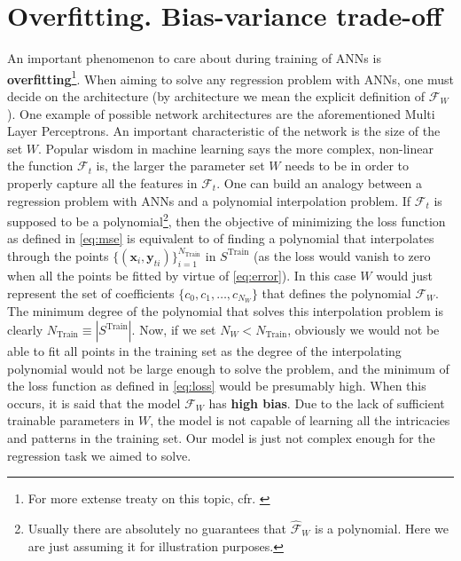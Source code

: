 \section{Overfitting. Bias-variance trade-off}\label{sec:overfitting}
\indent An important phenomenon to care about during training of ANNs is \textbf{overfitting}\footnote{For more extense treaty on this topic, cfr. \cite{Marsland2015Machine}}. When aiming to solve any regression problem with ANNs, one must decide on the architecture (by architecture we mean the explicit definition of $\mathcal{{F}}_W$). One example of possible network architectures are the aforementioned Multi Layer Perceptrons. An important characteristic of the network is the size of the set $W$. Popular wisdom in machine learning says the more complex, non-linear the function $\mathcal{F}_t$ is, the larger the parameter set $W$ needs to be in order to properly capture all the features in $\mathcal{F}_t$. One can build an analogy between a regression problem with ANNs and a polynomial interpolation problem. If $\mathcal{F}_t$ is supposed to be a polynomial\footnote{Usually there are absolutely no guarantees that $\mathcal{\hat{F}}_W$ is a polynomial. Here we are just assuming it for illustration purposes.}, then the objective of minimizing the loss function as defined in \cref{eq:mse} is equivalent to of finding a polynomial that interpolates through the points $\{(\mathbf{x}_i,\mathbf{y}_{ti})\}_{i=1}^{N_{\text{Train}}}$ in $S^\text{Train}$ (as the loss would vanish to zero when all the points be fitted by virtue of \cref{eq:error}). In this case $W$ would just represent the set of coefficients $\{c_0,c_1,\ldots,c_{N_W}\}$ that defines the polynomial $\mathcal{{F}}_W$. The minimum degree of the polynomial that solves this interpolation problem is clearly $N_{\text{Train}}\equiv\left|S^{\text{Train}}\right|$. Now, if we set $N_W<N_{\text{Train}}$, obviously we would not be able to fit all points in the training set as the degree of the interpolating polynomial would not be large enough to solve the problem, and the minimum of the loss function as defined in \cref{eq:loss} would be presumably high. When this occurs, it is said that the model $\mathcal{{F}}_W$ has \textbf{high bias}. Due to the lack of sufficient trainable parameters in $W$, the model is not capable of learning all the intricacies and patterns in the training set. Our model is just not complex enough for the regression task we aimed to solve.\\
%
